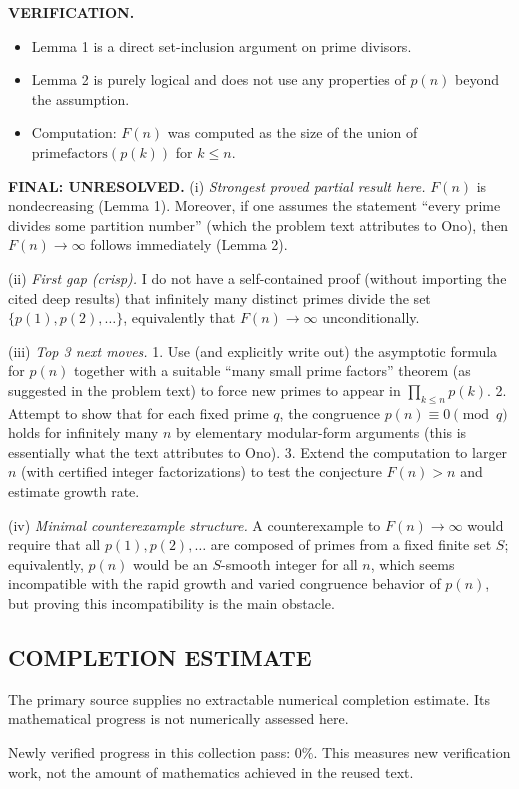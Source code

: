 \medskip
\noindent\textbf{VERIFICATION.}
\begin{itemize}
\item Lemma 1 is a direct set-inclusion argument on prime divisors.
\item Lemma 2 is purely logical and does not use any properties of $p(n)$ beyond the assumption.
\item Computation: $F(n)$ was computed as the size of the union of $\mathrm{primefactors}(p(k))$ for $k\le n$.
\end{itemize}

\medskip
\noindent\textbf{FINAL: \textbf{UNRESOLVED}.}
(i) \emph{Strongest proved partial result here.} $F(n)$ is nondecreasing (Lemma 1). Moreover, if one assumes the statement ``every prime divides some partition number'' (which the problem text attributes to Ono), then $F(n)\to\infty$ follows immediately (Lemma 2).

(ii) \emph{First gap (crisp).} I do not have a self-contained proof (without importing the cited deep results) that infinitely many distinct primes divide the set $\{p(1),p(2),\dots\}$, equivalently that $F(n)\to\infty$ unconditionally.

(iii) \emph{Top 3 next moves.}
1. Use (and explicitly write out) the asymptotic formula for $p(n)$ together with a suitable ``many small prime factors'' theorem (as suggested in the problem text) to force new primes to appear in $\prod_{k\le n}p(k)$.
2. Attempt to show that for each fixed prime $q$, the congruence $p(n)\equiv 0\pmod q$ holds for infinitely many $n$ by elementary modular-form arguments (this is essentially what the text attributes to Ono).
3. Extend the computation to larger $n$ (with certified integer factorizations) to test the conjecture $F(n)>n$ and estimate growth rate.

(iv) \emph{Minimal counterexample structure.} A counterexample to $F(n)\to\infty$ would require that all $p(1),p(2),\dots$ are composed of primes from a fixed finite set $S$; equivalently, $p(n)$ would be an $S$-smooth integer for all $n$, which seems incompatible with the rapid growth and varied congruence behavior of $p(n)$, but proving this incompatibility is the main obstacle.


\subsection*{COMPLETION ESTIMATE}
The primary source supplies no extractable numerical completion estimate. Its mathematical progress is not numerically assessed here.

Newly verified progress in this collection pass: $0\%$. This measures new verification work, not the amount of mathematics achieved in the reused text.
